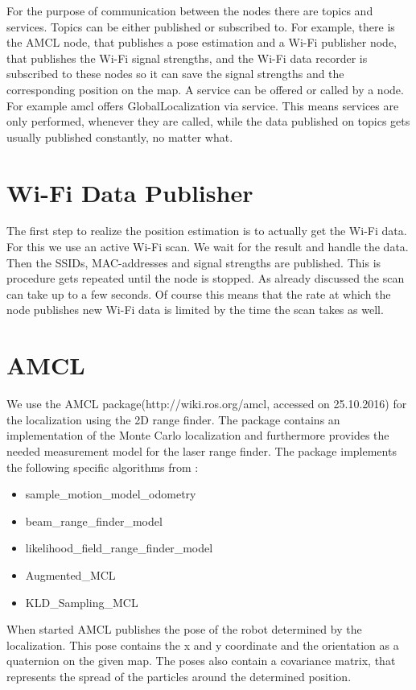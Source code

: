 For the purpose of communication between the nodes there are topics and services. Topics can be either published or subscribed to. For example, there is the AMCL node, that publishes a pose estimation and a Wi-Fi publisher node, that publishes the Wi-Fi signal strengths, and the Wi-Fi data recorder is subscribed to these nodes so it can save the signal strengths and the corresponding position on the map. A service can be offered or called by a node. For example amcl offers \gls{GlobalLocalization} via service. This means services are only performed, whenever they are called, while the data published on topics gets usually published constantly, no matter what.

\section{Wi-Fi Data Publisher}\label{sec:publisher}
The first step to realize the position estimation is to actually get the Wi-Fi data. For this we use an active Wi-Fi scan. We wait for the result and handle the data. Then the SSIDs, \Gls{MAC-address}es and signal strengths are published. This is procedure gets repeated until the node is stopped. As already discussed the scan can take up to a few seconds. Of course this means that the rate at which the node publishes new Wi-Fi data is limited by the time the scan takes as well.
\section{AMCL}\label{sec:amcl}
We use the AMCL package(http://wiki.ros.org/amcl, accessed on 25.10.2016) for the localization using the 2D range finder. The package contains an implementation of the Monte Carlo localization and furthermore provides the needed measurement model for the laser range finder. The package implements the following specific algorithms from \citet{Thrun:2005:PR:1121596}:
\begin{itemize}
\item sample\_motion\_model\_odometry
\item beam\_range\_finder\_model
\item likelihood\_field\_range\_finder\_model
\item Augmented\_MCL
\item KLD\_Sampling\_MCL
\end{itemize}
When started AMCL publishes the pose of the robot determined by the localization. This pose contains the x and y coordinate and the orientation as a quaternion on the given map. The poses also contain a covariance matrix, that represents the spread of the particles around the determined position.

